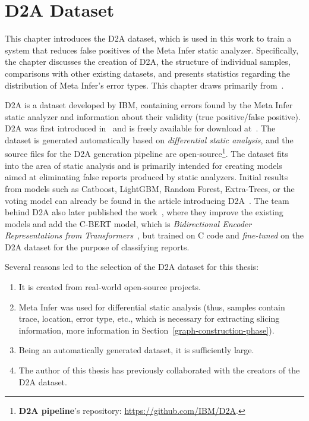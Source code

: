 
\chapter{D2A Dataset}
\label{chapter-d2a}
This chapter introduces the D2A dataset, which is used in this work to train a system that reduces false positives of the Meta Infer static analyzer. Specifically, the chapter discusses the creation of D2A, the structure of individual samples, comparisons with other existing datasets, and presents statistics regarding the distribution of Meta Infer's error types. This chapter draws primarily from~\cite{D2A-zheng2021d2a, D2A-webpage}.

D2A is a dataset developed by IBM, containing errors found by the Meta Infer static analyzer and information about their validity (true positive/false positive). D2A was first introduced in~\cite{D2A-zheng2021d2a} and is freely available for download at~\cite{D2A-webpage}. The dataset is generated automatically based on \textit{differential static analysis}, and the source files for the D2A generation pipeline are open-source\footnote{\textbf{D2A pipeline}'s repository: \url{https://github.com/IBM/D2A}.}. The dataset fits into the area of static analysis and is primarily intended for creating models aimed at eliminating false reports produced by static analyzers. Initial results from models such as Catboost, LightGBM, Random Forest, Extra-Trees, or the voting model can already be found in the article introducing D2A~\cite{D2A-zheng2021d2a}. The team behind D2A also later published the work~\cite{pujar2024analyzing}, where they improve the existing models and add the C-BERT model, which is \textit{Bidirectional Encoder Representations from Transformers}~\cite{devlin2018bert}, but trained on C code and \textit{fine-tuned} on the D2A dataset for the purpose of classifying reports.

Several reasons led to the selection of the D2A dataset for this thesis:
\begin{enumerate}
    \item It is created from real-world open-source projects.
    \item Meta Infer was used for differential static analysis (thus, samples contain trace, location, error type, etc., which is necessary for extracting slicing information, more information in Section~\ref{graph-construction-phase}).
    \item Being an automatically generated dataset, it is sufficiently large.
    \item The author of this thesis has previously collaborated with the creators of the D2A dataset.
\end{enumerate}


